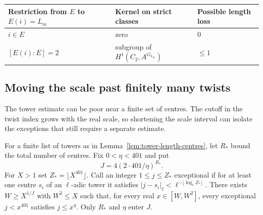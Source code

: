 \begin{construction}
\begin{tabular}{@{}lll@{}}\toprule
Restriction from \(E\) to \(E(i)=L_m\) & Kernel on strict classes &
Possible length loss\\\midrule
\(i\in E\) & zero & \(0\)\\
\([E(i):E]=2\) & subgroup of \(H^1(C_2,A^{G_{L_m}})\) & \(\le1\)\\\bottomrule
\end{tabular}
\caption{Dyadic descent for a single twist with coefficients \(A=\Q_2/\Z_2(-j)\). Restriction maps strict classes upstairs. Its image has length at most \(V(L_m,2,j)\). The only additional term downstairs comes from its kernel.}\label{fig:dyadic-strict-restriction}
\end{construction}

\subsection{Moving the scale past finitely many twists}
\label{subsec:cohomology-twist-threshold}

The tower estimate can be poor near a finite set of centres. The cutoff in the twist index grows with the real scale, so shortening the scale interval can isolate the exceptions that still require a separate estimate.

\begin{lemma}\label{lem:exceptional-twist-window}
For a finite list of towers as in Lemma~\ref{lem:tower-length-centres},
let \(R_*\) bound the total number of centres. Fix \(0<\eta<401\)
and put
\[
 J=4(2\cdot401/\eta)^{R_*}.
\]
For \(X>1\) set \(Z_*=\lfloor X^{401}\rfloor\). Call an integer
\(1\le j\le Z_*\) exceptional if for at least one centre \(s_i\)
of an \(\ell\)-adic tower it satisfies
\(\lvert j-s_i\rvert_\ell<\ell^{-\lfloor\log_\ell Z_*\rfloor}\).
There exists \(W\ge X^{1/J}\) with \(W^2\le X\) such that, for
every real \(x\in[W,W^2]\), every exceptional \(j<x^{401}\)
satisfies \(j\le x^\eta\). Only \(R_*\) and \(\eta\) enter \(J\).
\end{lemma}

